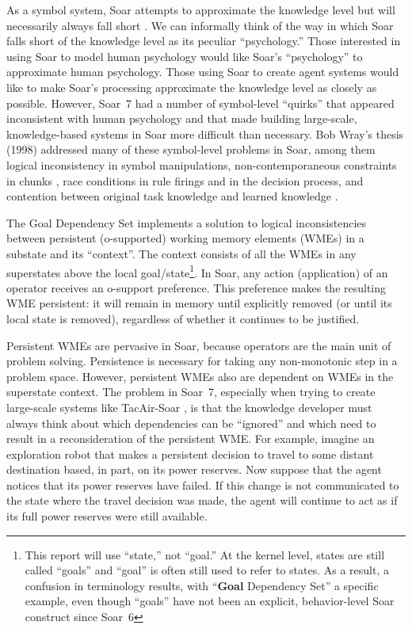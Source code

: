 As a symbol system, Soar attempts to approximate the knowledge level
but will necessarily always fall short \cite{Newell90:UTC}.  We can
informally think of the way in which Soar falls short of the knowledge
level as its peculiar ``psychology.''  Those interested in using Soar
to model human psychology would like Soar's ``psychology'' to
approximate human psychology.  Those using Soar to create agent
systems would like to make Soar's processing approximate the knowledge
level as closely as possible.  However, Soar~7 had a number of
symbol-level ``quirks'' that appeared inconsistent with human
psychology and that made building large-scale, knowledge-based systems
in Soar more difficult than necessary.  Bob Wray's thesis (1998)
\nocite{Wray98:Ensuring} addressed many of these symbol-level problems
in Soar, among them logical inconsistency in symbol manipulations,
non-contemporaneous constraints in chunks \cite{Wray96:Compilation},
race conditions in rule firings and in the decision process, and
contention between original task knowledge and learned knowledge
\cite{Wray01:Resolving}.

The Goal Dependency Set implements a solution to logical
inconsistencies between persistent (o-supported) working memory
elements (WMEs) in a substate and its ``context''.  The context
consists of all the WMEs in any superstates above the local
goal/state\footnote{This report will use ``state,'' not ``goal.''  At
the kernel level, states are still called ``goals'' and ``goal'' is often
still used to refer to states.    As a result, a
confusion in terminology results, with ``\textbf{Goal} Dependency Set'' a 
specific example, even though ``goals'' have not been
an explicit, behavior-level Soar construct since Soar~6}.  In Soar, any
action (application) of an operator receives an o-support preference.
This preference makes the resulting WME persistent: it will remain in
memory until explicitly removed (or until its local state is removed),
regardless of whether it continues to be justified.

Persistent WMEs are pervasive in Soar, because operators are the main
unit of problem solving.  Persistence is necessary for taking any
non-monotonic step in a problem space.  However, persistent WMEs also
are dependent on WMEs in the superstate context.  The problem in
Soar~7, especially when trying to create large-scale systems like
TacAir-Soar \cite{Jones99:Automated}, is that the knowledge developer
must always think about which dependencies can be ``ignored'' and
which need to result in a reconsideration of the persistent WME.  For
example, imagine an exploration robot that makes a persistent decision
to travel to some distant destination based, in part, on its power
reserves.  Now suppose that the agent notices that its power reserves
have failed.  If this change is not communicated to the state where
the travel decision was made, the agent will continue to act as if its
full power reserves were still available.


